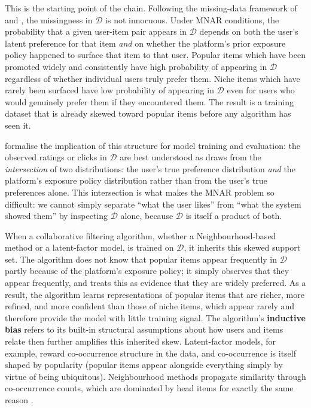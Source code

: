 \documentclass[11pt,a4paper]{report}
\begin{document}
This is the starting point of the chain. Following the missing-data framework of \citet{rubin1976inference} and \citet{little2002statistical}, the missingness in $\mathcal{D}$ is not innocuous. Under MNAR conditions, the probability that a given user-item pair appears in $\mathcal{D}$ depends on both the user's latent preference for that item \emph{and} on whether the platform's prior exposure policy happened to surface that item to that user. Popular items which have been promoted widely and consistently have high probability of appearing in $\mathcal{D}$ regardless of whether individual users truly prefer them. Niche items which have rarely been surfaced have low probability of appearing in $\mathcal{D}$ even for users who would genuinely prefer them if they encountered them. The result is a training dataset that is already skewed toward popular items before any algorithm has seen it.

\citet{schnabel2016ips} formalise the implication of this structure for model training and evaluation: the observed ratings or clicks in $\mathcal{D}$ are best understood as draws from the \emph{intersection} of two distributions: the user's true preference distribution \emph{and} the platform's exposure policy distribution rather than from the user's true preferences alone. This intersection is what makes the MNAR problem so difficult: we cannot simply separate ``what the user likes'' from ``what the system showed them'' by inspecting $\mathcal{D}$ alone, because $\mathcal{D}$ is itself a product of both.

When a collaborative filtering algorithm, whether a Neighbourhood-based method or a latent-factor model, is trained on $\mathcal{D}$, it inherits this skewed support set. The algorithm does not know that popular items appear frequently in $\mathcal{D}$ partly because of the platform's exposure policy; it simply observes that they appear frequently, and treats this as evidence that they are widely preferred. As a result, the algorithm learns representations of popular items that are richer, more refined, and more confident than those of niche items, which appear rarely and therefore provide the model with little training signal. The algorithm's \textbf{inductive bias} refers to its built-in structural assumptions about how users and items relate then further amplifies this inherited skew. Latent-factor models, for example, reward co-occurrence structure in the data, and co-occurrence is itself shaped by popularity (popular items appear alongside everything simply by virtue of being ubiquitous). Neighbourhood methods propagate similarity through co-occurrence counts, which are dominated by head items for exactly the same reason \citep{steck2011itempopularity, abdollahpouri2019managing}.
\end{document}

